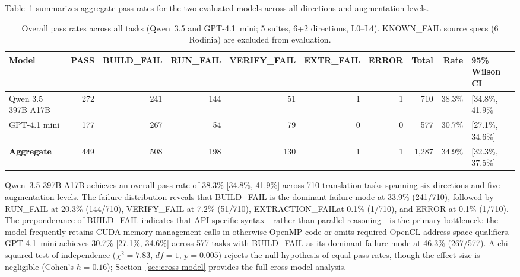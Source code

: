 \documentclass{article}
\newcommand{\buildfail}{\textsc{BUILD\_FAIL}}
\newcommand{\runfail}{\textsc{RUN\_FAIL}}
\newcommand{\verifyfail}{\textsc{VERIFY\_FAIL}}
\newcommand{\extractionfail}{\textsc{EXTRACTION\_FAIL}}
\begin{document}
Table~\ref{tab:overall-pass} summarizes aggregate pass rates for the two evaluated models across all directions and augmentation levels.

\begin{table}[t]
\centering
\caption{Overall pass rates across all tasks (Qwen~3.5 and GPT-4.1~mini; 5 suites, 6+2 directions, L0--L4). KNOWN\_FAIL source specs (6 Rodinia) are excluded from evaluation.}
\label{tab:overall-pass}
\small
\begin{tabular}{@{}lrrrrrrrrl@{}}
\toprule
Model & PASS & \buildfail & \runfail{} & \verifyfail{} & EXTR\_FAIL & ERROR & Total & Rate & 95\% Wilson CI \\
\midrule
Qwen 3.5 397B-A17B & 272 & 241 & 144 & 51 & 1 & 1 & 710 & 38.3\% & [34.8\%, 41.9\%] \\ %
GPT-4.1 mini & 177 & 267 & 54 & 79 & 0 & 0 & 577 & 30.7\% & [27.1\%, 34.6\%] \\ %
\textbf{Aggregate} & 449 & 508 & 198 & 130 & 1 & 1 & 1{,}287 & 34.9\% & [32.3\%, 37.5\%] \\ %
\bottomrule
\end{tabular}
\end{table}

Qwen~3.5 397B-A17B achieves an overall pass rate of 38.3\% [34.8\%, 41.9\%] across 710 translation tasks spanning six directions and five augmentation levels. The failure distribution reveals that \buildfail{} is the dominant failure mode at 33.9\% (241/710), followed by \runfail{} at 20.3\% (144/710), \verifyfail{} at 7.2\% (51/710), \extractionfail at 0.1\% (1/710), and ERROR at 0.1\% (1/710). The preponderance of \buildfail{} indicates that API-specific syntax---rather than parallel reasoning---is the primary bottleneck: the model frequently retains CUDA memory management calls in otherwise-OpenMP code or omits required OpenCL address-space qualifiers. GPT-4.1~mini achieves 30.7\% [27.1\%, 34.6\%] across 577 tasks with \buildfail{} as its dominant failure mode at 46.3\% (267/577). A chi-squared test of independence ($\chi^2 = 7.83$, $df = 1$, $p = 0.005$) rejects the null hypothesis of equal pass rates, though the effect size is negligible (Cohen's $h = 0.16$); Section~\ref{sec:cross-model} provides the full cross-model analysis. %
\end{document}
